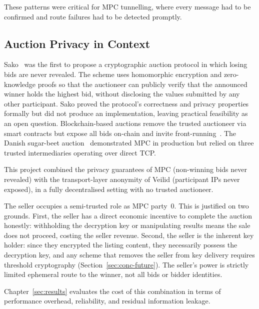 These patterns were critical for MPC tunnelling, where every message had to be
confirmed and route failures had to be detected promptly.

\subsection{Auction Privacy in Context}
\label{sec:ctx-auction-privacy}

Sako~\cite{sako2000_hide_losers} was the first to propose a cryptographic
auction protocol in which losing bids are never revealed.  The scheme uses
homomorphic encryption and zero-knowledge proofs so that the auctioneer can
publicly verify that the announced winner holds the highest bid, without
disclosing the values submitted by any other participant.  Sako proved the
protocol's correctness and privacy properties formally but did not produce an
implementation, leaving practical feasibility as an open question.
Blockchain-based auctions remove
the trusted auctioneer via smart contracts but expose all bids on-chain and
invite front-running~\cite{daian2019_flashboys2}.  The Danish sugar-beet
auction~\cite{bogetoft2009_mpc_live} demonstrated MPC in production but relied
on three trusted intermediaries operating over direct TCP.

This project combined the privacy guarantees of MPC (non-winning bids never
revealed) with the transport-layer anonymity of Veilid (participant IPs never
exposed), in a fully decentralised setting with no trusted auctioneer.

The seller occupies a semi-trusted role as MPC party~0.  This is justified
on two grounds.  First, the seller has a direct economic incentive to complete
the auction honestly: withholding the decryption key or manipulating results
means the sale does not proceed, costing the seller revenue.  Second, the
seller is the inherent key holder: since they encrypted the listing content,
they necessarily possess the decryption key, and any scheme that removes
the seller from key delivery requires threshold cryptography
(Section~\ref{sec:conc-future}).  The seller's power is strictly limited
ephemeral route to the winner, not all bids or bidder identities.

Chapter~\ref{sec:results} evaluates the cost of this combination in terms of
performance overhead, reliability, and residual information leakage.


